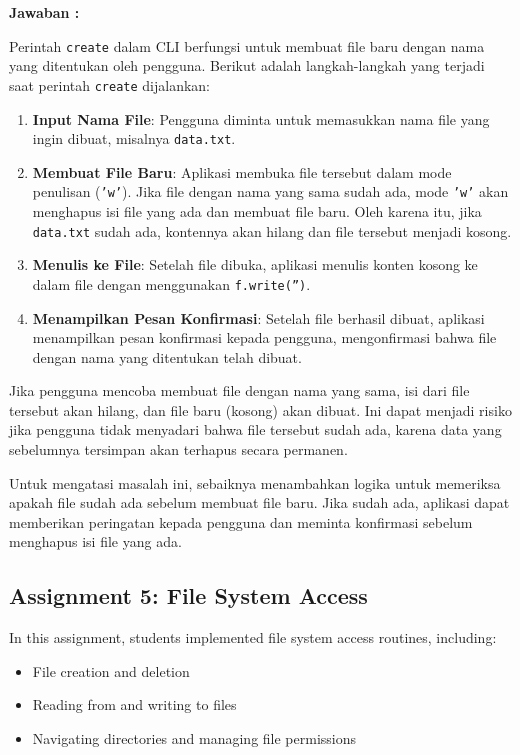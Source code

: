 \documentclass[12pt]{article}
\begin{document}
\textbf{Jawaban : }

Perintah \texttt{create} dalam CLI berfungsi untuk membuat file baru dengan nama yang ditentukan oleh pengguna. Berikut adalah langkah-langkah yang terjadi saat perintah \texttt{create} dijalankan:

\begin{enumerate}
    \item \textbf{Input Nama File}: Pengguna diminta untuk memasukkan nama file yang ingin dibuat, misalnya \texttt{data.txt}.
    \item \textbf{Membuat File Baru}: Aplikasi membuka file tersebut dalam mode penulisan (\texttt{'w'}). Jika file dengan nama yang sama sudah ada, mode \texttt{'w'} akan menghapus isi file yang ada dan membuat file baru. Oleh karena itu, jika \texttt{data.txt} sudah ada, kontennya akan hilang dan file tersebut menjadi kosong.
    \item \textbf{Menulis ke File}: Setelah file dibuka, aplikasi menulis konten kosong ke dalam file dengan menggunakan \texttt{f.write('')}.
    \item \textbf{Menampilkan Pesan Konfirmasi}: Setelah file berhasil dibuat, aplikasi menampilkan pesan konfirmasi kepada pengguna, mengonfirmasi bahwa file dengan nama yang ditentukan telah dibuat.
\end{enumerate}

Jika pengguna mencoba membuat file dengan nama yang sama, isi dari file tersebut akan hilang, dan file baru (kosong) akan dibuat. Ini dapat menjadi risiko jika pengguna tidak menyadari bahwa file tersebut sudah ada, karena data yang sebelumnya tersimpan akan terhapus secara permanen.

Untuk mengatasi masalah ini, sebaiknya menambahkan logika untuk memeriksa apakah file sudah ada sebelum membuat file baru. Jika sudah ada, aplikasi dapat memberikan peringatan kepada pengguna dan meminta konfirmasi sebelum menghapus isi file yang ada.

\subsection{Assignment 5: File System Access}
In this assignment, students implemented file system access routines, including:
\begin{itemize}
    \item File creation and deletion
    \item Reading from and writing to files
    \item Navigating directories and managing file permissions
\end{itemize}
\end{document}
